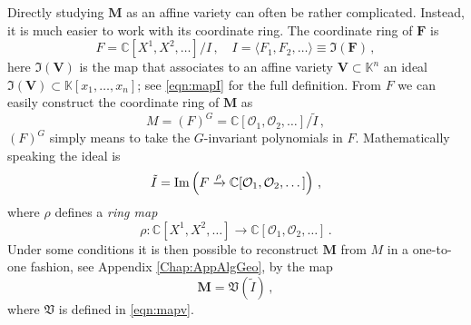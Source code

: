 \documentclass[main.tex]{subfiles}
\begin{document}
Directly studying $\mathbf{M}$ as an affine variety can often be rather complicated. Instead, it is much easier to work with its coordinate ring.  The coordinate ring of $\mathbf{F}$ is
\begin{equation}\label{eqn:abuse1}
F=\mathbb{C}[X^1,X^2,\dots]/I\,,\quad I=\langle F_1,F_2,\dots\rangle\equiv\mathfrak{I}(\mathbf{F}) \,,
\end{equation}
here $\mathfrak{I}(\mathbf{V})$ is the map that associates to an affine variety $\mathbf{V}\subset\mathbb{K}^n$ an ideal $\mathfrak{I}(\mathbf{V})\subset\mathbb{K}[x_1,\dots,x_n]$; see \eqref{eqn:mapI} for the full definition.  From $F$ we can easily construct the coordinate ring of $\mathbf{M}$ as
\begin{equation}\label{eqn:Mring}
M=(F)^G=\mathbb{C}[\mathcal{O}_1,\mathcal{O}_2,\dots]/\tilde{I}\,,
\end{equation}
$(F)^G$ simply means to take the $G$-invariant polynomials in $F$.  Mathematically speaking the ideal is \cite{Gray:2008yu}
\begin{equation}
\tilde{I}=\operatorname{Im}\left(F\xrightarrow[]{\rho}\mathbb{C}[\mathcal{O}_1,\mathcal{O}_2,\dots]\right)\,,
\end{equation}
where $\rho$ defines a \textit{ring map}
\begin{equation}
\rho:\mathbb{C}[X^1,X^2,\dots]\to\mathbb{C}[\mathcal{O}_1,\mathcal{O}_2,\dots]\,.
\end{equation}
Under some conditions it is then possible to reconstruct $\mathbf{M}$ from $M$ in a one-to-one fashion, see Appendix \ref{Chap:AppAlgGeo}, by the map
\begin{equation}
\mathbf{M}=\mathfrak{V}(\tilde{I})\,,
\end{equation}
where $\mathfrak{V}$ is defined in \eqref{eqn:mapv}.
\end{document}
